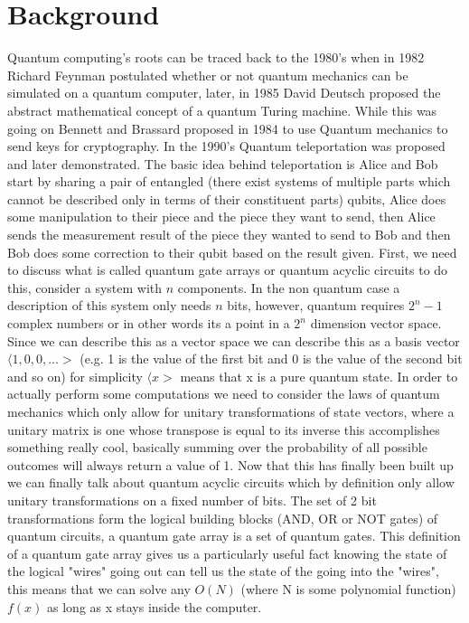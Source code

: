 \documentclass{article}
\begin{document}
\section{Background}
Quantum computing's roots can be traced back to the 1980's when in 1982 Richard Feynman postulated whether or not quantum mechanics can be simulated on a quantum computer, later, in 1985  David Deutsch proposed the abstract mathematical concept of a quantum Turing machine. While this was going on  Bennett and Brassard proposed in 1984 to use Quantum mechanics to send keys for cryptography. In the 1990's Quantum teleportation was proposed and later demonstrated. The basic idea behind teleportation is Alice and Bob start by sharing a pair of entangled (there exist systems of multiple parts which cannot be described only in terms of their constituent parts) qubits, Alice does some manipulation to their piece and the piece they want to send, then Alice sends the measurement result of the piece they wanted to send to Bob and then Bob does some correction to their qubit based on the result given. First, we need to discuss what is called quantum gate arrays or quantum acyclic circuits\cite{Shor1995} to do this, consider a system with $n$ components. In the non quantum case a description of this system only needs $n$ bits, however, quantum requires $2^n  - 1 $ complex numbers or in other words its a point in a $2^n$ dimension vector space. Since we can describe this as a vector space we can describe this as a basis vector $\langle 1,0,0,...>$ (e.g. 1 is the value of the first bit and 0 is the value of the second bit and so on) for simplicity $\langle x>$ means that x is a pure quantum state. In order to actually perform some computations we need to consider the laws of quantum mechanics which only allow for unitary transformations of state vectors, where a unitary matrix is one whose transpose is equal to its inverse this accomplishes something really cool, basically summing over the probability of all possible outcomes will always return a value of 1. Now that this has finally been built up we can finally talk about quantum acyclic circuits which by definition only allow unitary transformations on a fixed number of bits. The set of 2 bit transformations form the logical building blocks (AND, OR or NOT gates) of quantum circuits, a quantum gate array is a set of quantum gates. This definition of a quantum gate array gives us a particularly useful fact knowing the state of the logical "wires" going out can tell us the state of the going into the "wires", this means that we can solve any $O(N)$ (where N is some polynomial function) $f(x)$ as long as x stays inside the computer. 
\end{document}
